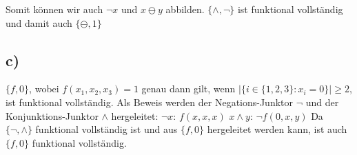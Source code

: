 \documentclass[11pt, a4paper]{article}
\begin{document}
Somit können wir auch $\neg x$ und $x \ominus y$ abbilden.
$\{\wedge,\neg\}$ ist funktional vollständig und damit auch $\{\ominus,1\}$


\subsection*{c)}
$\{f, 0\}$, wobei $f(x_1,x_2,x_3)=1$ genau dann gilt, wenn $|\{i\in \{1,2,3\}: x_i=0\}|\geq 2$, ist funktional vollständig. Als Beweis werden der Negations-Junktor $\neg$ und der Konjunktions-Junktor $\wedge$ hergeleitet:\newline
$\neg x$: $f(x,x,x)$\newline
$x\wedge y$: $\neg f(0,x,y)$\newline
Da $\{\neg ,\wedge\}$ funktional vollständig ist und aus $\{f,0\}$ hergeleitet werden kann, ist auch $\{f,0\}$ funktional vollständig.
\end{document}
